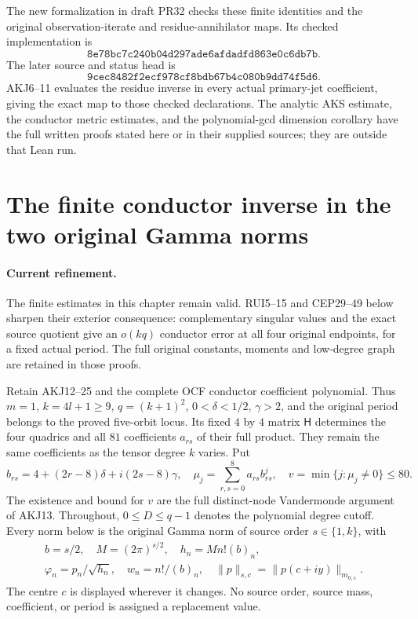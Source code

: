 \documentclass[11pt,a4paper]{article}
\begin{document}
The new formalization in draft PR32 checks these finite identities and
the original observation-iterate and residue-annihilator maps. Its
checked implementation is
\[\texttt{8e78bc7c240b04d297ade6afdadfd863e0c6db7b}.\]
The later source and status head is
\[\texttt{9cec8482f2ecf978cf8bdb67b4c080b9dd74f5d6}.\]
AKJ6--11 evaluates the residue inverse in every actual primary-jet
coefficient, giving the exact map to those checked declarations.
The analytic AKS estimate, the conductor metric estimates, and the
polynomial-gcd dimension corollary have the full written proofs stated
here or in their supplied sources; they are outside that Lean run.


\clearpage
\section{The finite conductor inverse in the two original Gamma norms}
\label{sec:AIE}
\paragraph{Current refinement.}
The finite estimates in this chapter remain valid. RUI5--15 and
CEP29--49 below sharpen their exterior consequence: complementary
singular values and the exact source quotient give an $o(kq)$
conductor error at all four original endpoints, for a fixed actual
period. The full original constants, moments and low-degree graph
are retained in those proofs.


Retain AKJ12--25 and the complete OCF conductor coefficient polynomial.
Thus $m=1$, $k=4l+1\ge9$, $q=(k+1)^2$, $0<\delta<1/2$,
$\gamma>2$, and the original period belongs to the proved five-orbit
locus. Its fixed $4$ by $4$ matrix $\mathsf H$ determines the four
quadrics and all $81$ coefficients $a_{rs}$ of their full product.
They remain the same coefficients as the tensor degree $k$ varies.
Put
\[
 b_{rs}=4+(2r-8)\delta+i(2s-8)\gamma,\quad
 \mu_j=\sum_{r,s=0}^8a_{rs}b_{rs}^j,\quad
 v=\min\{j:\mu_j\ne0\}\le80.
 \tag{AIE1}
\]
The existence and bound for $v$ are the full distinct-node Vandermonde
argument of AKJ13. Throughout, $0\le D\le q-1$ denotes the polynomial
degree cutoff. Every norm below is the original Gamma norm of source
order $s\in\{1,k\}$, with
\[
 \begin{gathered}
 b=s/2,\quad M=(2\pi)^{s/2},\quad h_n=M n!(b)_n,\\
 \varphi_n=p_n/\sqrt{h_n},\quad w_n=n!/(b)_n,
 \quad \|p\|_{s,c}=\|p(c+iy)\|_{m_{0,s}}.
 \end{gathered}\tag{AIE2}
\]
The centre $c$ is displayed wherever it changes. No source order,
source mass, coefficient, or period is assigned a replacement value.
\end{document}
